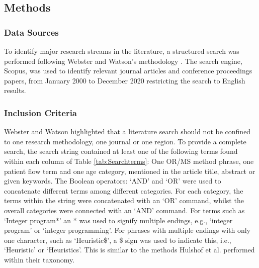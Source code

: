 \documentclass[../thesis.tex]{subfiles}
\begin{document}
\subsection{Methods} \label{sec:SC}
 
\subsubsection{Data Sources}
To identify major research streams in the literature, a structured search was performed following Webster and Watson's methodology \cite{Webster}. The search engine, Scopus, was used to identify relevant journal articles and conference proceedings papers, from January 2000 to December 2020 restricting the search to English results.

\subsubsection{Inclusion Criteria}
Webster and Watson \cite{Webster} highlighted that a literature search should not be confined to one research methodology, one journal or one region. To provide a complete search, the search string contained at least one of the following terms found within each column of Table \ref{tab:Searchterms}: One OR/MS method phrase, one patient flow term and one age category, mentioned in the article title, abstract or given keywords. The Boolean operators: `AND' and `OR' were used to concatenate different terms among different categories. For each category, the terms within the string were concatenated with an `OR' command, whilst the overall categories were connected with an `AND' command. For terms such as `Integer program*' an * was used to signify multiple endings, e.g., `integer program' or `integer programming'. For phrases with multiple endings with only one character, such as `Heuristic\$', a \$ sign was used to indicate this, i.e., `Heuristic' or `Heuristics'. This is similar to the methods Hulshof et al. \cite{PHulshof} performed within their taxonomy. 
\end{document}
